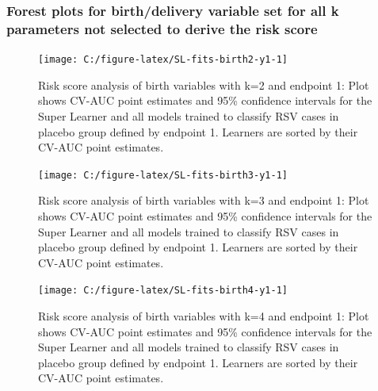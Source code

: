 \documentclass[11pt]{article}
\begin{document}
\clearpage

\hypertarget{forest-plots-for-birthdelivery-variable-set-for-all-k-parameters-not-selected-to-derive-the-risk-score}{%
\subsubsection{Forest plots for birth/delivery variable set for all k parameters not selected to derive the risk score}\label{forest-plots-for-birthdelivery-variable-set-for-all-k-parameters-not-selected-to-derive-the-risk-score}}

\begin{figure}[H]

{\centering \texttt{[image: C:/figure-latex/SL-fits-birth2-y1-1]} 

}

\caption[Risk score analysis of birth variables with k=2 and endpoint 1.]{Risk score analysis of birth variables with k=2 and endpoint 1: Plot shows CV-AUC point estimates and 95\% confidence intervals for the Super Learner and all models trained to classify RSV cases in placebo group defined by endpoint 1. Learners are sorted by their CV-AUC point estimates.}\label{fig:SL-fits-birth2-y1}
\end{figure}

\begin{figure}[H]

{\centering \texttt{[image: C:/figure-latex/SL-fits-birth3-y1-1]} 

}

\caption[Risk score analysis of birth variables with k=3 and endpoint 1.]{Risk score analysis of birth variables with k=3 and endpoint 1: Plot shows CV-AUC point estimates and 95\% confidence intervals for the Super Learner and all models trained to classify RSV cases in placebo group defined by endpoint 1. Learners are sorted by their CV-AUC point estimates.}\label{fig:SL-fits-birth3-y1}
\end{figure}

\begin{figure}[H]

{\centering \texttt{[image: C:/figure-latex/SL-fits-birth4-y1-1]} 

}

\caption[Risk score analysis of birth variables with k=4 and endpoint 1.]{Risk score analysis of birth variables with k=4 and endpoint 1: Plot shows CV-AUC point estimates and 95\% confidence intervals for the Super Learner and all models trained to classify RSV cases in placebo group defined by endpoint 1. Learners are sorted by their CV-AUC point estimates.}\label{fig:SL-fits-birth4-y1}
\end{figure}
\end{document}
